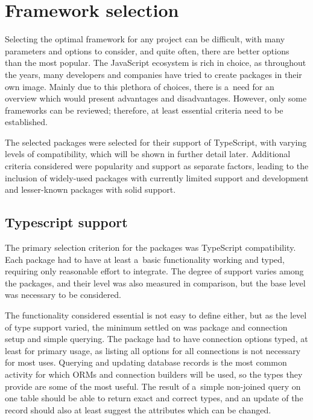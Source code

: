\chapter{Framework selection}

Selecting the optimal framework for any project can be difficult, with many
parameters and options to consider, and quite often, there are better options
than the most popular. The JavaScript ecosystem is rich in choice, as throughout
the years, many developers and companies have tried to create packages in their
own image. Mainly due to this plethora of choices, there is a~need for an
overview which would present advantages and disadvantages. However, only some
frameworks can be reviewed; therefore, at least essential criteria need to be
established. 

The selected packages were selected for their support of TypeScript, with
varying levels of compatibility, which will be shown in further detail later.
Additional criteria considered were popularity and support as separate factors,
leading to the inclusion of widely-used packages with currently limited support
and development and lesser-known packages with solid support. 

\section{Typescript support}
The primary selection criterion for the packages was TypeScript compatibility.
Each package had to have at least a~basic functionality working and typed,
requiring only reasonable effort to integrate. The degree of support varies
among the packages, and their level was also measured in comparison, but the
base level was necessary to be considered.

The functionality considered essential is not easy to define either, but as the
level of type support varied, the minimum settled on was package and connection
setup and simple querying. The package had to have connection options typed, at
least for primary usage, as listing all options for all connections is not
necessary for most uses. Querying and updating database records is the most
common activity for which ORMs and connection builders will be used, so the
types they provide are some of the most useful. The result of a~simple
non-joined query on one table should be able to return exact and correct types,
and an update of the record should also at least suggest the attributes which
can be changed.

